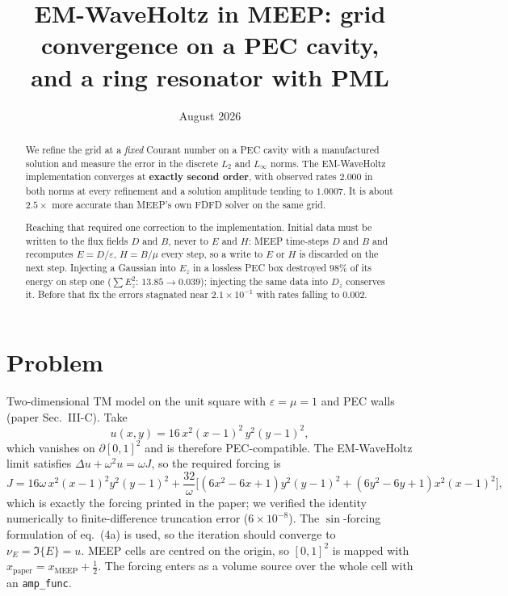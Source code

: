 \documentclass[11pt]{article}
\title{EM-WaveHoltz in MEEP: grid convergence on a PEC cavity,\\
       and a ring resonator with PML}
\author{}
\date{August 2026}
\begin{document}
\maketitle

\begin{abstract}
We refine the grid at a \emph{fixed} Courant number on a PEC cavity with a
manufactured solution and measure the error in the discrete $L_2$ and
$L_\infty$ norms. The EM-WaveHoltz implementation converges at
\textbf{exactly second order}, with observed rates $2.000$ in both norms at
every refinement and a solution amplitude tending to $1.0007$. It is about
$2.5\times$ more accurate than MEEP's own FDFD solver on the same grid.

Reaching that required one correction to the implementation. Initial data must
be written to the flux fields $D$ and $B$, never to $E$ and $H$: MEEP
time-steps $D$ and $B$ and recomputes $E=D/\varepsilon$, $H=B/\mu$ every step,
so a write to $E$ or $H$ is discarded on the next step. Injecting a Gaussian
into $E_z$ in a lossless PEC box destroyed $98\%$ of its energy on step one
($\sum E_z^2$: $13.85 \to 0.039$); injecting the same data into $D_z$ conserves
it. Before that fix the errors stagnated near $2.1\times10^{-1}$ with rates
falling to $0.002$.
\end{abstract}

\section{Problem}

Two-dimensional TM model on the unit square with $\varepsilon=\mu=1$ and PEC
walls (paper Sec.~III-C). Take
\begin{equation}
  u(x,y) = 16\,x^2(x-1)^2\,y^2(y-1)^2 ,
\end{equation}
which vanishes on $\partial[0,1]^2$ and is therefore PEC-compatible. The
EM-WaveHoltz limit satisfies $\Delta u + \omega^2 u = \omega J$, so the required
forcing is
\begin{equation}
  J = 16\omega\,x^2(x-1)^2y^2(y-1)^2
    + \frac{32}{\omega}\Big[(6x^2-6x+1)y^2(y-1)^2 + (6y^2-6y+1)x^2(x-1)^2\Big],
\end{equation}
which is exactly the forcing printed in the paper; we verified the identity
numerically to finite-difference truncation error ($6\times10^{-8}$). The
$\sin$-forcing formulation of eq.~(4a) is used, so the iteration should converge
to $\nu_E = \Im\{E\} = u$. MEEP cells are centred on the origin, so $[0,1]^2$ is
mapped with $x_{\text{paper}} = x_{\text{MEEP}} + \tfrac12$. The forcing enters
as a volume source over the whole cell with an \texttt{amp\_func}.
\end{document}
